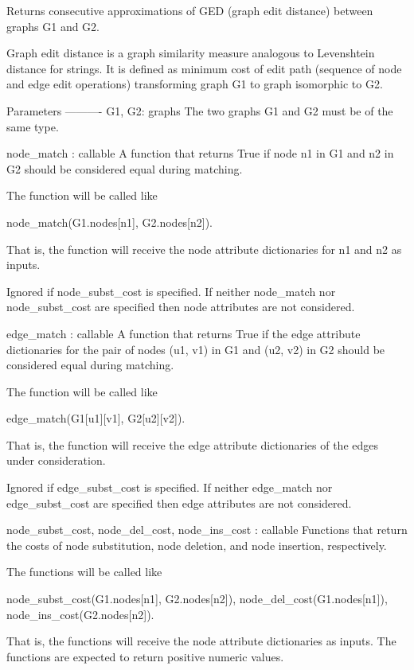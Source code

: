 \begin{DoxyVerb}Returns consecutive approximations of GED (graph edit distance)
between graphs G1 and G2.

Graph edit distance is a graph similarity measure analogous to
Levenshtein distance for strings.  It is defined as minimum cost
of edit path (sequence of node and edge edit operations)
transforming graph G1 to graph isomorphic to G2.

Parameters
----------
G1, G2: graphs
    The two graphs G1 and G2 must be of the same type.

node_match : callable
    A function that returns True if node n1 in G1 and n2 in G2
    should be considered equal during matching.

    The function will be called like

       node_match(G1.nodes[n1], G2.nodes[n2]).

    That is, the function will receive the node attribute
    dictionaries for n1 and n2 as inputs.

    Ignored if node_subst_cost is specified.  If neither
    node_match nor node_subst_cost are specified then node
    attributes are not considered.

edge_match : callable
    A function that returns True if the edge attribute dictionaries
    for the pair of nodes (u1, v1) in G1 and (u2, v2) in G2 should
    be considered equal during matching.

    The function will be called like

       edge_match(G1[u1][v1], G2[u2][v2]).

    That is, the function will receive the edge attribute
    dictionaries of the edges under consideration.

    Ignored if edge_subst_cost is specified.  If neither
    edge_match nor edge_subst_cost are specified then edge
    attributes are not considered.

node_subst_cost, node_del_cost, node_ins_cost : callable
    Functions that return the costs of node substitution, node
    deletion, and node insertion, respectively.

    The functions will be called like

       node_subst_cost(G1.nodes[n1], G2.nodes[n2]),
       node_del_cost(G1.nodes[n1]),
       node_ins_cost(G2.nodes[n2]).

    That is, the functions will receive the node attribute
    dictionaries as inputs.  The functions are expected to return
    positive numeric values.


\end{DoxyVerb}
